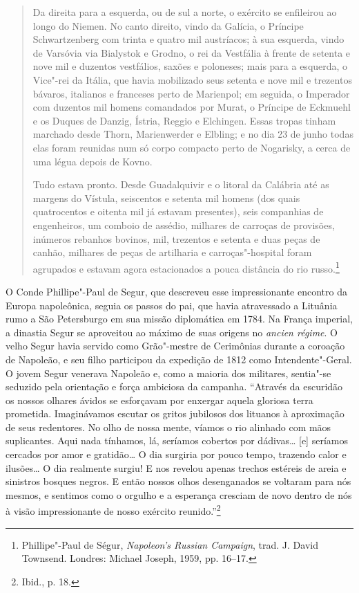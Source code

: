 \begin{quote}
Da direita para a esquerda, ou de sul a norte, o exército se enfileirou
ao longo do Niemen. No canto direito, vindo da Galícia, o Príncipe
Schwartzenberg com trinta e quatro mil austríacos; à sua esquerda, vindo
de Varsóvia via Bialystok e Grodno, o rei da Vestfália à frente de
setenta e nove mil e duzentos vestfálios, saxões e poloneses; mais para
a esquerda, o Vice"-rei da Itália, que havia mobilizado seus setenta e
nove mil e trezentos bávaros, italianos e franceses perto de Marienpol;
em seguida, o Imperador com duzentos mil homens comandados por Murat, o
Príncipe de Eckmuehl e os Duques de Danzig, Ístria, Reggio e Elchingen.
Essas tropas tinham marchado desde Thorn, Marienwerder e Elbling; e no
dia 23 de junho todas elas foram reunidas num só corpo compacto perto de
Nogarisky, a cerca de uma légua depois de Kovno.

Tudo estava pronto. Desde Guadalquivir e o litoral da Calábria até as
margens do Vístula, seiscentos e setenta mil homens (dos quais
quatrocentos e oitenta mil já estavam presentes), seis companhias de
engenheiros, um comboio de assédio, milhares de carroças de provisões,
inúmeros rebanhos bovinos, mil, trezentos e setenta e duas peças de
canhão, milhares de peças de artilharia e carroças"-hospital foram
agrupados e estavam agora estacionados a pouca distância do rio
russo.\footnote{Phillipe"-Paul de Ségur, \textit{Napoleon's Russian Campaign}, trad. J. David Townsend. Londres: Michael Joseph, 1959, pp. 16--17.} \end{quote}

O Conde Phillipe"-Paul de Segur, que descreveu esse impressionante
encontro da Europa napoleônica, seguia os passos do pai, que havia
atravessado a Lituânia rumo a São Petersburgo em sua missão diplomática
em 1784. Na França imperial, a dinastia Segur se aproveitou ao máximo de
suas origens no \textit{ancien régime}. O velho Segur havia servido como
Grão"-mestre de Cerimônias durante a coroação de Napoleão, e seu filho
participou da expedição de 1812 como Intendente"-Geral. O jovem Segur
venerava Napoleão e, como a maioria dos militares, sentia"-se seduzido
pela orientação e força ambiciosa da campanha. ``Através da escuridão os
nossos olhares ávidos se esforçavam por enxergar aquela gloriosa terra
prometida. Imaginávamos escutar os gritos jubilosos dos lituanos à
aproximação de seus redentores. No olho de nossa mente, víamos o rio
alinhado com mãos suplicantes. Aqui nada tínhamos, lá, seríamos cobertos
por dádivas\ldots{} {[}e{]} seríamos cercados por amor e gratidão\ldots{} O
dia surgiria por pouco tempo, trazendo calor e ilusões\ldots{} O dia
realmente surgiu! E nos revelou apenas trechos estéreis de areia e
sinistros bosques negros. E então nossos olhos desenganados se voltaram
para nós mesmos, e sentimos como o orgulho e a esperança cresciam de
novo dentro de nós à visão impressionante de nosso exército
reunido.''\footnote{Ibid., p. 18.}

